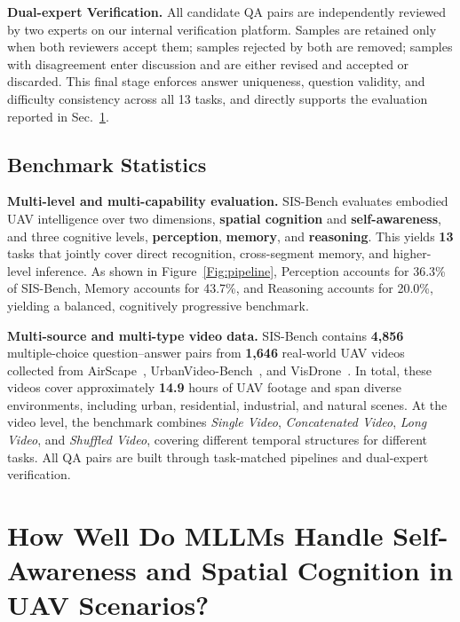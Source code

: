 \documentclass[sigconf, screen, review, anonymous]{acmart}
\begin{document}
\noindent \textbf{Dual-expert Verification.}
All candidate QA pairs are independently reviewed by two experts on our internal verification platform. Samples are retained only when both reviewers accept them; samples rejected by both are removed; samples with disagreement enter discussion and are either revised and accepted or discarded. This final stage enforces answer uniqueness, question validity, and difficulty consistency across all 13 tasks, and directly supports the evaluation reported in Sec.~\ref{sec:eva}.



\subsection{Benchmark Statistics}
\label{sec:stats}

\noindent \textbf{Multi-level and multi-capability evaluation.}
SIS-Bench evaluates embodied UAV intelligence over two dimensions, \textbf{spatial cognition} and \textbf{self-awareness}, and three cognitive levels, \textbf{perception}, \textbf{memory}, and \textbf{reasoning}. This yields \textbf{13} tasks that jointly cover direct recognition, cross-segment memory, and higher-level inference. As shown in Figure~\ref{Fig:pipeline}, Perception accounts for 36.3\% of SIS-Bench, Memory accounts for 43.7\%, and Reasoning accounts for 20.0\%, yielding a balanced, cognitively progressive benchmark.

\noindent \textbf{Multi-source and multi-type video data.}
SIS-Bench contains \textbf{4,856} multiple-choice question--answer pairs from \textbf{1,646} real-world UAV videos collected from AirScape~\cite{zhao2025airscape}, UrbanVideo-Bench~\cite{UrbanVideo-Bench}, and VisDrone~\cite{wen2019visdrone}. In total, these videos cover approximately \textbf{14.9} hours of UAV footage and span diverse environments, including urban, residential, industrial, and natural scenes. At the video level, the benchmark combines \emph{Single Video}, \emph{Concatenated Video}, \emph{Long Video}, and \emph{Shuffled Video}, covering different temporal structures for different tasks. All QA pairs are built through task-matched pipelines and dual-expert verification.





\section{How Well Do MLLMs Handle Self-Awareness and Spatial Cognition in UAV Scenarios?}
\label{sec:eva}
\end{document}

